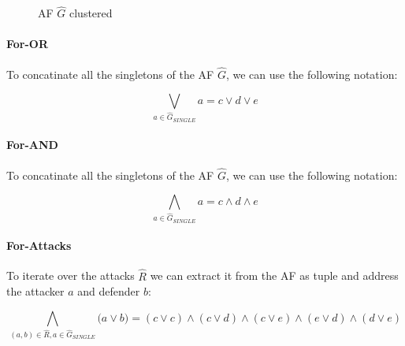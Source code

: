 \begin{figure}[h]
    \centering
    \caption{\ac{AF} $\hat{G}$ clustered}
    \label{af:backgroundSATExample1}
\end{figure}

\paragraph{For-OR} To concatinate all the singletons of the AF $\hat{G}$, we can use the following notation:

$$
\bigvee_{a \in \hat{G}_{\!S\!I\!N\!G\!L\!E}} a = c \lor d \lor e
$$

\paragraph{For-AND} To concatinate all the singletons of the AF $\hat{G}$, we can use the following notation:

$$
\bigwedge_{a \in \hat{G}_{\!S\!I\!N\!G\!L\!E}} a = c \land d \land e
$$

\paragraph{For-Attacks} To iterate over the attacks $\hat{R}$ we can extract it from the AF as tuple and address the attacker $a$ and defender $b$:

$$
\bigwedge_{(a, b) \in \hat{R}, a\in \hat{G}_{\!S\!I\!N\!G\!L\!E}} \big( a \lor b \big) = (c \lor c) \land
(c \lor d) \land (c \lor e) \land (e \lor d) \land (d \lor e)
$$

